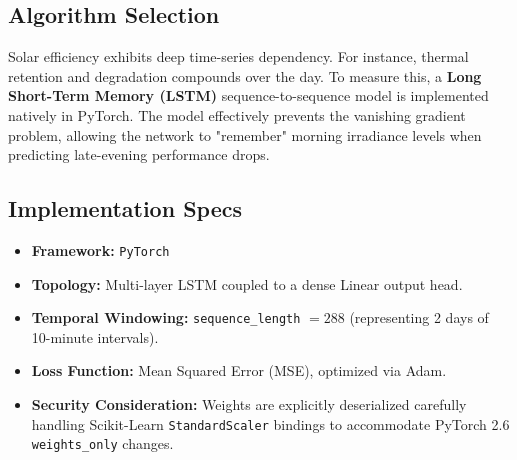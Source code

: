 \documentclass[11pt, a4paper]{article}
\begin{document}
\subsection{Algorithm Selection}
Solar efficiency exhibits deep time-series dependency. For instance, thermal retention and degradation compounds over the day. To measure this, a \textbf{Long Short-Term Memory (LSTM)} sequence-to-sequence model is implemented natively in PyTorch. The model effectively prevents the vanishing gradient problem, allowing the network to "remember" morning irradiance levels when predicting late-evening performance drops.

\subsection{Implementation Specs}
\begin{itemize}
    \item \textbf{Framework:} \texttt{PyTorch}
    \item \textbf{Topology:} Multi-layer LSTM coupled to a dense Linear output head.
    \item \textbf{Temporal Windowing:} \texttt{sequence\_length} $= 288$ (representing 2 days of 10-minute intervals).
    \item \textbf{Loss Function:} Mean Squared Error (MSE), optimized via Adam.
    \item \textbf{Security Consideration:} Weights are explicitly deserialized carefully handling Scikit-Learn \texttt{StandardScaler} bindings to accommodate PyTorch 2.6 \texttt{weights\_only} changes.
\end{itemize}
\end{document}
